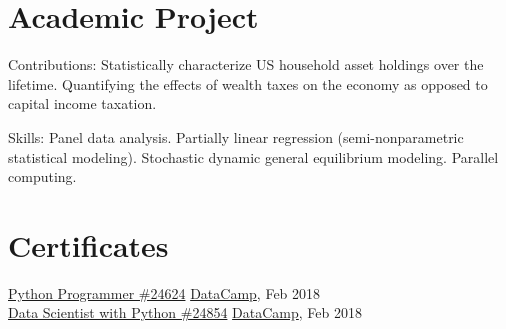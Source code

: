 \documentclass[]{hieudo-build}
\begin{document}
\begin{minipage}[t]{0.65\textwidth}
\section{Academic Project}
\begin{tightemize}
\item Contributions: Statistically characterize US household asset holdings over the lifetime. Quantifying the effects of wealth taxes on the economy as opposed to capital income taxation.
\item Skills: Panel data analysis. Partially linear regression (semi-nonparametric statistical modeling). Stochastic dynamic general equilibrium modeling. Parallel computing.
\end{tightemize}
\sectionsep





\section{Certificates}
\href{https://www.datacamp.com/statement-of-accomplishment/track/2380b142ca0efe8ccf46d72295e6c90ef2b7b165?lipi=urn%3Ali%3Apage%3Ad_flagship3_profile_view_base%3BC877CZzpQNG%2BcsyBdM5s%2Fw%3D%3D}{Python Programmer \#24624} \hfill \href{https://www.datacamp.com/home}{DataCamp}, Feb 2018 \\
\href{https://www.datacamp.com/statement-of-accomplishment/track/acd2c1fde62ac121f65f4e2f004ee9f5cdbd06ba?lipi=urn%3Ali%3Apage%3Ad_flagship3_profile_view_base%3BC877CZzpQNG%2BcsyBdM5s%2Fw%3D%3D}{Data Scientist with Python \#24854} \hfill \href{https://www.datacamp.com/home}{DataCamp}, Feb 2018 \\

\end{minipage} 
\end{document}
